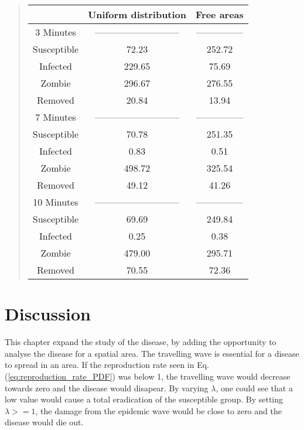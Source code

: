 \documentclass[%
twoside,                 %
final,                   %
chapterprefix=true,      %
open=right               %
10pt]{book}
\begin{document}
\begin{quote}
\begin{tabular}{ccc}
\hline
\multicolumn{1}{c}{  } & \multicolumn{1}{c}{ Uniform distribution } & \multicolumn{1}{c}{ Free areas } \\
\hline
3 Minutes   & --------------------------- & --------------- \\
\hline
Susceptible & 72.23                       & 252.72          \\
Infected    & 229.65                      & 75.69           \\
Zombie      & 296.67                      & 276.55          \\
Removed     & 20.84                       & 13.94           \\
\hline
7 Minutes   & --------------------------- & --------------- \\
\hline
Susceptible & 70.78                       & 251.35          \\
Infected    & 0.83                        & 0.51            \\
Zombie      & 498.72                      & 325.54          \\
Removed     & 49.12                       & 41.26           \\
\hline
10 Minutes  & --------------------------- & --------------- \\
\hline
Susceptible & 69.69                       & 249.84          \\
Infected    & 0.25                        & 0.38            \\
Zombie      & 479.00                      & 295.71          \\
Removed     & 70.55                       & 72.36           \\
\hline
\end{tabular}
\end{quote}

\noindent

\section{Discussion}
This chapter expand the study of the disease, by adding the opportunity to analyse the disease for a spatial area. The travelling wave is essential for a disease to spread in an area. If the reproduction rate seen in Eq.(\ref{eq:reproduction_rate_PDF}) was below 1, the travelling wave would decrease towards zero and the disease would disapear. By varying $\lambda$, one could see that a low value would cause a total eradication of the susceptible group. By setting $\lambda>=1$, the damage from the epidemic wave would be close to zero and the disease would die out.
\end{document}
